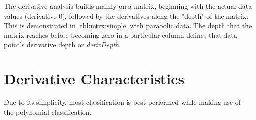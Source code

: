 \documentclass[main.tex]{subfiles}
\begin{document}
  
  The derivative analysis builds mainly on a matrix, beginning with the actual data values (derivative 0), followed by the derivatives along the "depth" of the matrix. This is demonstrated in \cref{tbl:mtrx:simple} with parabolic data. The depth that the matrix reaches before becoming zero in a particular column defines that data point's derivative depth or \textit{derivDepth}.

  
  
  \section{Derivative Characteristics}
    
    Due to its simplicity, most classification is best performed while making use of the polynomial classification.
    
\end{document}
